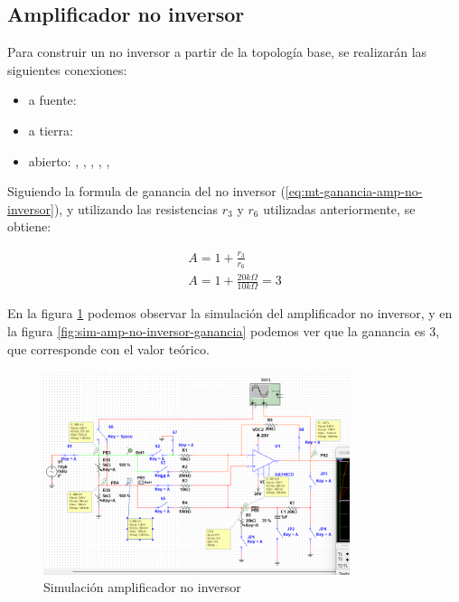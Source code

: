 \FloatBarrier
\subsection{Amplificador no inversor}

Para construir un no inversor a partir de la topología base, se realizarán las siguientes conexiones:

\begin{itemize}
    \item a fuente: 
    \item a tierra: 
    \item abierto: , , , , , 
\end{itemize}

Siguiendo la formula de ganancia del no inversor (\ref{eq:mt-ganancia-amp-no-inversor}), y utilizando las resistencias $r_3$ y $r_6$ utilizadas anteriormente, se obtiene:

\begin{align*}
    A = 1 + \frac{r_3}{r_6} \\
    A = 1 + \frac{20k\Omega}{10k\Omega} = 3
\end{align*}

En la figura \ref{fig:sim-amp-no-inversor} podemos observar la simulación del amplificador no inversor, y en la figura \ref{fig:sim-amp-no-inversor-ganancia} podemos ver que la ganancia es 3, que corresponde con el valor teórico.

\begin{figure}[ht]
    \centering
    \includegraphics[width=0.8\textwidth]{src/images/simulaciones/conexion-no-inversor.png}
    \caption{Simulación amplificador no inversor}
    \label{fig:sim-amp-no-inversor}
\end{figure}

